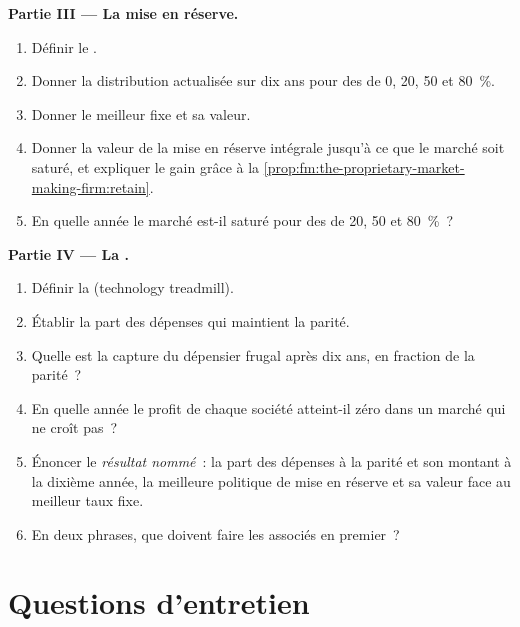 \begin{problem}
\medskip\noindent\textbf{Partie III --- La mise en réserve.}
\begin{enumerate}[resume]
\item Définir le .
\item Donner la distribution actualisée sur dix ans pour des  de 0, 20, 50 et 80~\%.
\item Donner le meilleur  fixe et sa valeur.
\item Donner la valeur de la mise en réserve intégrale jusqu'à ce que le marché soit saturé, et expliquer le gain grâce à la \cref{prop:fm:the-proprietary-market-making-firm:retain}.
\item En quelle année le marché est-il saturé pour des  de 20, 50 et 80~\%~?
\end{enumerate}

\medskip\noindent\textbf{Partie IV --- La .}
\begin{enumerate}[resume]
\item Définir la  (technology treadmill).
\item Établir la part des dépenses qui maintient la parité.
\item Quelle est la capture du dépensier frugal après dix ans, en fraction de la parité~?
\item En quelle année le profit de chaque société atteint-il zéro dans un marché qui ne croît pas~?
\item Énoncer le \emph{résultat nommé}~: la part des dépenses à la parité et son montant à la dixième année, la meilleure politique de mise en réserve et sa valeur face au meilleur
taux fixe.
\item En deux phrases, que doivent faire les associés en premier~?
\end{enumerate}
\end{problem}

\section{Questions d'entretien}

